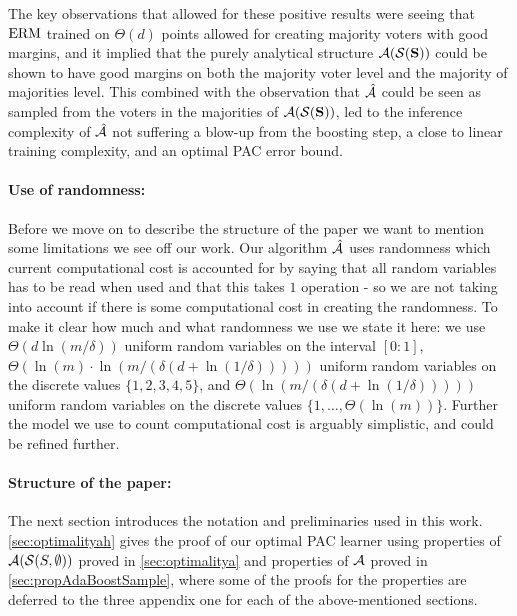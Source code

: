 The key observations that allowed for these positive results were seeing that $ \mathrm{ERM} $ trained on $ \Theta(d) $ points allowed for creating majority voters with good margins, and it implied that the purely analytical structure $ \mathcal{A}(\mathcal{S}(\mathbf{S})) $ could be shown to have good margins on both the majority voter level and the majority of majorities level. This combined with the observation that $ \mathcal{\hat{A}} $ could be seen as sampled from the voters in the majorities of $ \mathcal{A}(\mathcal{S}(\mathbf{S})) $, led to the inference complexity of $\mathcal{\hat{A}}$ not suffering a blow-up from the boosting step, a close to linear training complexity, and an optimal PAC error bound. 

\paragraph{Use of randomness:}Before we move on to describe the structure of the paper we want to mention some limitations we see off our work. Our algorithm $ \mathcal{\hat{A}} $ uses randomness which current computational cost is accounted for by saying that all random variables has to be read when used and that this takes $ 1 $ operation - so we are not taking into account if there is some computational cost in creating the randomness. To make it clear how much and what randomness we use we state it here: we use $ \Theta(d\ln{(m/\delta)}) $ uniform random variables on the interval $ [0:1] $,  $ \Theta(\ln{(m )}\cdot\ln{(m/(\delta(d+\ln{(1/\delta )})) )})$ uniform random variables on the discrete values  $ \{ 1,2,3,4,5 \} $, and $ \Theta(\ln{(m/(\delta(d+\ln{(1/\delta )})) )})$  uniform random variables on the discrete values $ \{ 1,\ldots,\Theta(\ln{(m )}) \} $. Further the model we use to count computational cost is arguably simplistic, and could be refined further.     

\paragraph{Structure of the paper:}The next section introduces the notation and preliminaries used in this work. \cref{sec:optimalityah} gives the proof of our optimal PAC learner using properties of $ \mathcal{A}(\mathcal{S}(S,\emptyset)) $ proved in \cref{sec:optimalitya} and properties of $ \mathcal{A} $ proved in \cref{sec:propAdaBoostSample}, where some of the proofs for the properties are deferred to the three appendix one for each of the above-mentioned sections. 
